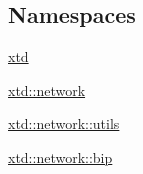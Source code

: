 \subsection*{Namespaces}
\begin{DoxyCompactItemize}
\item 
 \hyperlink{namespacextd}{xtd}
\item 
 \hyperlink{namespacextd_1_1network}{xtd\+::network}
\item 
 \hyperlink{namespacextd_1_1network_1_1utils}{xtd\+::network\+::utils}
\item 
 \hyperlink{namespacextd_1_1network_1_1bip}{xtd\+::network\+::bip}
\end{DoxyCompactItemize}
